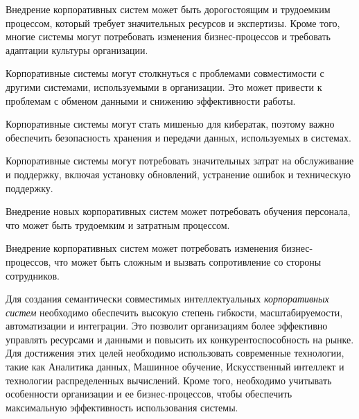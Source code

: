 \begin{textitemize}
    \item Внедрение корпоративных систем может быть дорогостоящим и трудоемким процессом, который требует значительных ресурсов и экспертизы. Кроме того, многие системы могут потребовать изменения бизнес-процессов и требовать адаптации культуры организации.
    \item Корпоративные системы могут столкнуться с проблемами совместимости с другими системами, используемыми в организации. Это может привести к проблемам с обменом данными и снижению эффективности работы.
    \item Корпоративные системы могут стать мишенью для кибератак, поэтому важно обеспечить безопасность хранения и передачи данных, используемых в системах.
    \item Корпоративные системы могут потребовать значительных затрат на обслуживание и поддержку, включая установку обновлений, устранение ошибок и техническую поддержку.
    \item Внедрение новых корпоративных систем может потребовать обучения персонала, что может быть трудоемким и затратным процессом.
    \item Внедрение корпоративных систем может потребовать изменения бизнес-процессов, что может быть сложным и вызвать сопротивление со стороны сотрудников.
\end{textitemize}

Для создания семантически совместимых интеллектуальных \textit{корпоративных систем} необходимо обеспечить высокую степень гибкости, масштабируемости, автоматизации и интеграции. Это позволит организациям более эффективно управлять ресурсами и данными и повысить их конкурентоспособность на рынке. Для достижения этих целей необходимо использовать современные технологии, такие как Аналитика данных, Машинное обучение, Искусственный интеллект и технологии распределенных вычислений. Кроме того, необходимо учитывать особенности организации и ее бизнес-процессов, чтобы обеспечить максимальную эффективность использования системы.

